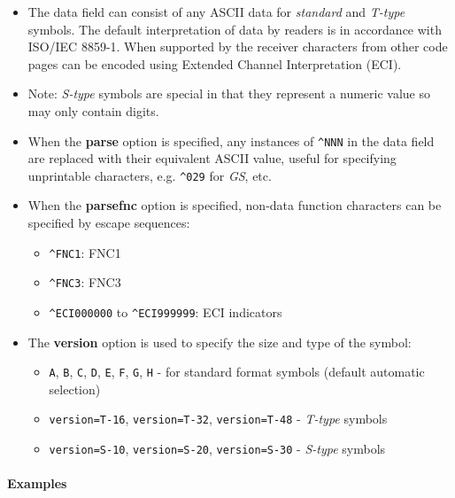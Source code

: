 \begin{itemize}
\tightlist
\item
  The data field can consist of any ASCII data for \emph{standard} and
  \emph{T-type} symbols. The default interpretation of data by readers
  is in accordance with ISO/IEC 8859-1. When supported by the receiver
  characters from other code pages can be encoded using Extended Channel
  Interpretation (ECI).
\item
  Note: \emph{S-type} symbols are special in that they represent a
  numeric value so may only contain digits.
\item
  When the \textbf{parse} option is specified, any instances of
  \texttt{\^{}NNN} in the data field are replaced with their equivalent
  ASCII value, useful for specifying unprintable characters, e.g.
  \texttt{\^{}029} for \emph{GS}, etc.
\item
  When the \textbf{parsefnc} option is specified, non-data function
  characters can be specified by escape sequences:

  \begin{itemize}
  \tightlist
  \item
    \texttt{\^{}FNC1}: FNC1
  \item
    \texttt{\^{}FNC3}: FNC3
  \item
    \texttt{\^{}ECI000000} to \texttt{\^{}ECI999999}: ECI indicators
  \end{itemize}
\item
  The \textbf{version} option is used to specify the size and type of
  the symbol:

  \begin{itemize}
  \tightlist
  \item
    \texttt{A}, \texttt{B}, \texttt{C}, \texttt{D}, \texttt{E},
    \texttt{F}, \texttt{G}, \texttt{H} - for standard format symbols
    (default automatic selection)
  \item
    \texttt{version=T-16}, \texttt{version=T-32}, \texttt{version=T-48}
    - \emph{T-type} symbols
  \item
    \texttt{version=S-10}, \texttt{version=S-20}, \texttt{version=S-30}
    - \emph{S-type} symbols
  \end{itemize}
\end{itemize}

\hypertarget{examples-47}{%
\paragraph{Examples}\label{examples-47}}

